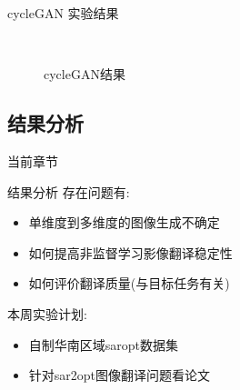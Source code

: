 \begin{frame}{cycleGAN 实验结果}
    \begin{figure}[!htbp]
        \centering
        \\[0.5cm]
        \label{fig:0102}
        \caption{cycleGAN结果}
    \end{figure}  
\end{frame}

\subsection{结果分析}

\begin{frame}{当前章节}
\end{frame}

\begin{frame}{结果分析}
    存在问题有:
    \begin{itemize}
        \item 单维度到多维度的图像生成不确定
        \item 如何提高非监督学习影像翻译稳定性
        \item 如何评价翻译质量(与目标任务有关)
    \end{itemize}

    本周实验计划:
    \begin{itemize}
        \item 自制华南区域saropt数据集
        \item 针对sar2opt图像翻译问题看论文
    \end{itemize}
\end{frame}